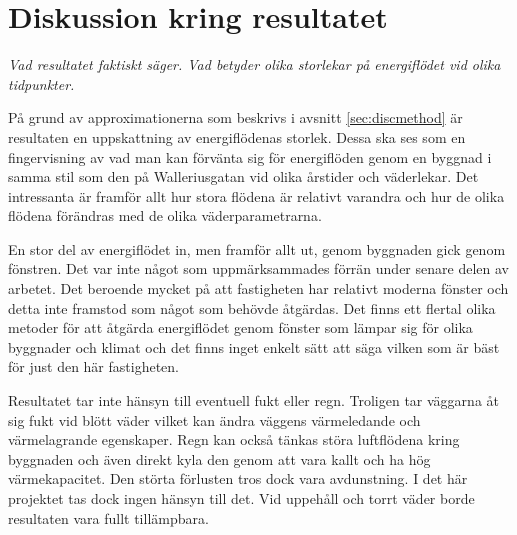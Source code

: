 \section{Diskussion kring resultatet}

\emph{\color{red} Vad resultatet faktiskt säger. Vad betyder olika storlekar på energiflödet vid olika tidpunkter.}

På grund av approximationerna som beskrivs i avsnitt \ref{sec:discmethod} är resultaten en uppskattning av energiflödenas storlek. Dessa ska ses som en fingervisning av vad man kan förvänta sig för energiflöden genom en byggnad i samma stil som den på Walleriusgatan vid olika årstider och väderlekar. Det intressanta är framför allt hur stora flödena är relativt varandra och hur de olika flödena förändras med de olika väderparametrarna.

En stor del av energiflödet in, men framför allt ut, genom byggnaden gick genom fönstren. Det var inte något som uppmärksammades förrän under senare delen av arbetet. Det beroende mycket på att fastigheten har relativt moderna fönster och detta inte framstod som något som behövde åtgärdas. Det finns ett flertal olika metoder för att åtgärda energiflödet genom fönster som lämpar sig för olika byggnader och klimat och det finns inget enkelt sätt att säga vilken som är bäst för just den här fastigheten.

Resultatet tar inte hänsyn till eventuell fukt eller regn. Troligen tar väggarna åt sig fukt vid blött väder vilket kan ändra väggens värmeledande och värmelagrande egenskaper. Regn kan också tänkas störa luftflödena kring byggnaden och även direkt kyla den genom att vara kallt och ha hög värmekapacitet. Den störta förlusten tros dock vara avdunstning. I det här projektet tas dock ingen hänsyn till det. Vid uppehåll och torrt väder borde resultaten vara fullt tillämpbara.
